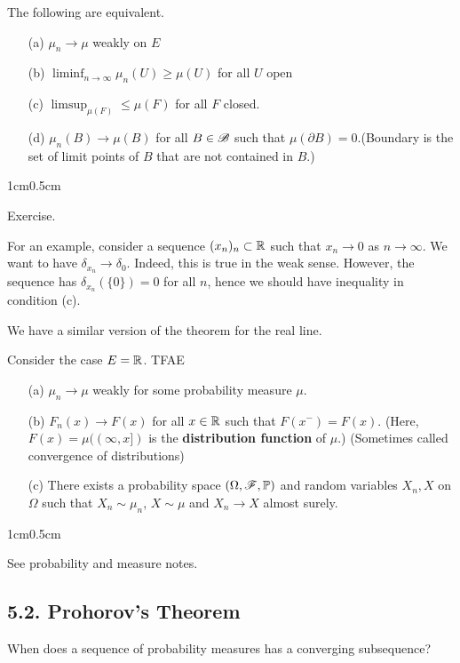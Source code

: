 \documentclass[10pt,a4paper]{report}
\newenvironment{proof}
{\begin{changemargin}{1cm}{0.5cm} 
	}%
	{\end{changemargin}
}
\begin{document}
 The following are equivalent.
\begin{itemize}
\item[(a)] $\mu_n \rightarrow \mu$ weakly on $E$
\item[(b)] $\liminf_{n\rightarrow \infty} \mu_n(U) \geq \mu(U)$ for all $U$ open
\item[(c)] $\limsup_{\mu(F)} \leq \mu(F)$ for all $F$ closed.
\item[(d)] $\mu_n(B) \rightarrow \mu(B)$ for all $B \in \mathscr{B}$ such that $\mu(\partial B)=0$.(Boundary is the set of limit points of $B$ that are not contained in $B$.)
\end{itemize}
\begin{proof}
\pf Exercise.
\end{proof}
\s

For an example, consider a sequence $(x_n)_n \subset \mathbb{R}$ such that $x_n \rightarrow 0$ as $n\rightarrow \infty$. We want to have $\delta_{x_n} \rightarrow \delta_0$. Indeed, this is true in the weak sense. However, the sequence has $\delta_{x_n}(\{0\}) =0$ for all $n$, hence we should have inequality in condition (c).
\s

We have a similar version of the theorem for the real line.
\s

 Consider the case $E =\mathbb{R}$. TFAE
\begin{itemize}
\item[(a)] $\mu_n \rightarrow \mu$ weakly for some probability measure $\mu$.
\item[(b)] $F_n(x) \rightarrow F(x)$ for all $x\in \mathbb{R}$ such that $F(x^-) = F(x)$. (Here, $F(x)  = \mu((\infty,x])$ is the \textbf{distribution function} of $\mu$.) (Sometimes called convergence of distributions)
\item[(c)] There exists a probability space $(\Omega,\mathscr{F}, \mathbb{P})$ and random variables $X_n, X$ on $\Omega$ such that $X_n \sim \mu_n$, $X\sim \mu$ and $X_n \rightarrow X$ almost surely.
\end{itemize}
\begin{proof}
\pf See probability and measure notes.
\end{proof}
\s

\subsection*{5.2. Prohorov's Theorem}

When does a sequence of probability measures has a converging subsequence?
\s
\end{document}
